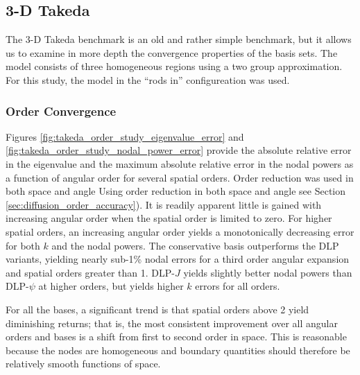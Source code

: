 \subsection{3-D Takeda}

The 3-D Takeda benchmark is an old and rather simple benchmark, but it
allows us to examine in more depth the convergence properties of 
the basis sets.  The model consists of three homogeneous regions using 
a two group approximation.  For this study, the model in the ``rods in''
configureation was used.

\subsubsection{Order Convergence}

Figures \ref{fig:takeda_order_study_eigenvalue_error} and
\ref{fig:takeda_order_study_nodal_power_error} provide the absolute 
relative error in the eigenvalue and the maximum 
absolute relative error in the nodal powers as a function of angular 
order for several spatial orders.  Order reduction was used in 
both space and angle Using order reduction
in both space and angle see 
Section \ref{sec:diffusion_order_accuracy}). It is readily apparent little 
is gained with increasing angular order when the spatial order is limited 
to zero.  For higher spatial orders, an increasing angular order 
yields a monotonically decreasing error for both $k$ and the nodal 
powers.  The conservative basis outperforms the DLP variants, yielding
nearly sub-1\% nodal errors for a third order angular expansion and 
spatial orders greater than 1.  DLP-$J$ yields slightly 
better nodal powers than DLP-$\psi$ at higher orders, but yields higher 
$k$ errors for all orders. 

For all the bases, a significant trend is that spatial orders above 
2 yield diminishing returns; that is, the most consistent improvement
over all angular orders and bases is a shift from first to second order 
in space.  This is reasonable because the nodes are homogeneous and 
boundary quantities should therefore be relatively smooth functions of space.

